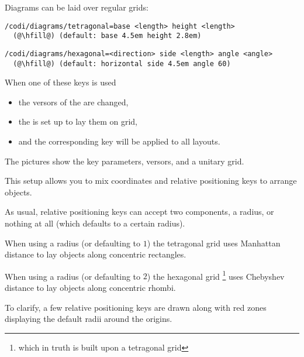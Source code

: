\begin{marginfigure}[0cm]
\begin{subfigure}{\linewidth}
    \bigskip
  \end{subfigure}
\end{marginfigure}

Diagrams can be laid over regular grids:

\begin{lstlisting}[style=metacode]
/codi/diagrams/tetragonal=base <length> height <length>
  (@\hfill@) (default: base 4.5em height 2.8em)
\end{lstlisting}

\begin{lstlisting}[style=metacode]
/codi/diagrams/hexagonal=<direction> side <length> angle <angle>
  (@\hfill@) (default: horizontal side 4.5em angle 60)
\end{lstlisting}

When one of these keys is used
\begin{itemize}[noitemsep]
  \item the versors of the  are changed,
  \item the  is set up to lay them on grid,
  \item and the corresponding key will be applied to all layouts.
\end{itemize}

The pictures show the key parameters, versors, and a unitary grid.

This setup allows you to mix coordinates and
relative positioning keys to arrange objects.

As usual, relative positioning keys can accept two components, a radius,
or nothing at all (which defaults to a certain radius).

When using a radius (or defaulting to $1$)
the tetragonal grid uses Manhattan distance to
lay objects along concentric rectangles.

When using a radius (or defaulting to $2$)
the hexagonal grid%
\footnote{which in truth is built upon a tetragonal grid}
uses Chebyshev distance to
lay objects along concentric rhombi.

To clarify, a few relative positioning keys are drawn along
with red zones displaying the default radii around the origins.
